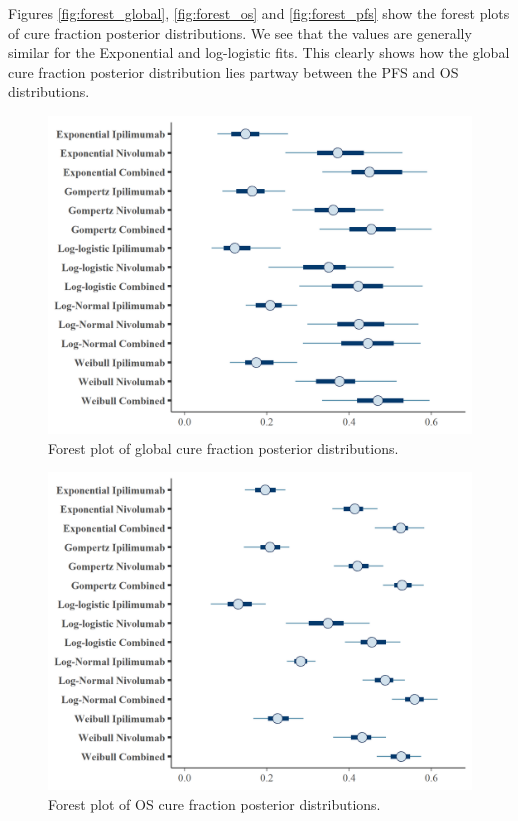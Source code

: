 \documentclass[
]{article}
\begin{document}
Figures \ref{fig:forest_global}, \ref{fig:forest_os} and
\ref{fig:forest_pfs} show the forest plots of cure fraction posterior
distributions. We see that the values are generally similar for the
Exponential and log-logistic fits. This clearly shows how the global
cure fraction posterior distribution lies partway between the PFS and OS
distributions.

\begin{figure}

{\centering \includegraphics[width=0.6\linewidth]{../plots/cf_global_forest_plot} 

}

\caption{\label{fig:forest_global}Forest plot of global cure fraction posterior distributions.}\label{fig:unnamed-chunk-11}
\end{figure}

\begin{figure}

{\centering \includegraphics[width=0.6\linewidth]{../plots/cf_os_forest_plot} 

}

\caption{\label{fig:forest_os}Forest plot of OS cure fraction posterior distributions.}\label{fig:unnamed-chunk-12}
\end{figure}
\end{document}
